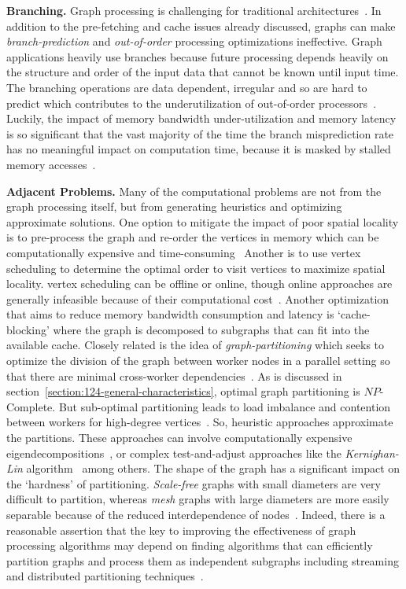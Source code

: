 \textbf{Branching.}
Graph processing is challenging for traditional architectures~\cite{Dadu2021}.
In addition to the pre-fetching and cache issues already discussed, graphs can make \textit{branch-prediction} and \textit{out-of-order} processing optimizations ineffective. 
Graph applications heavily use branches because future processing depends heavily on the structure and order of the input data that cannot be known until input time.
The branching operations are data dependent, irregular and so are hard to predict which contributes to the underutilization of out-of-order processors~\cite{Aananthakrishnan2020}.
Luckily, the impact of memory bandwidth under-utilization and memory latency is so significant that the vast majority of the time the branch misprediction rate has no meaningful impact on computation time, because it is masked by stalled memory accesses~\cite{Beamer2015}.


\textbf{Adjacent Problems.}
Many of the computational problems are not from the graph processing itself, but from generating heuristics and optimizing approximate solutions. 
One option to mitigate the impact of poor spatial locality is to pre-process the graph and re-order the vertices in memory which can be computationally expensive and time-consuming~\cite{Balaji2018}
Another is to use vertex scheduling to determine the optimal order to visit vertices to maximize spatial locality. 
vertex scheduling can be offline or online, though online approaches are generally infeasible because of their computational cost~\cite{Mukkara2018}.
Another optimization that aims to reduce memory bandwidth consumption and latency is `cache-blocking' where the graph is decomposed to subgraphs that can fit into the available cache. 
Closely related is the idea of \textit{graph-partitioning} which seeks to optimize the division of the graph between worker nodes in a parallel setting so that there are minimal cross-worker dependencies~\cite{Balaji2018}.
As is discussed in section~\ref{section:124-general-characteristics}, optimal graph partitioning is $NP$-Complete.
But sub-optimal partitioning leads to load imbalance and contention between workers for high-degree vertices~\cite{Chen2019}.
So, heuristic approaches approximate the partitions.
These approaches can involve computationally expensive eigendecompositions~\cite{Ng2001}, or complex test-and-adjust approaches like the \textit{Kernighan-Lin} algorithm~\cite{Kernighan1970} among others.
The shape of the graph has a significant impact on the `hardness' of partitioning.
\textit{Scale-free} graphs with small diameters are very difficult to partition, whereas \textit{mesh} graphs with large diameters are more easily separable because of the reduced interdependence of nodes~\cite{Beamer2015}. 
Indeed, there is a reasonable assertion that the key to improving the effectiveness of graph processing algorithms may depend on finding algorithms that can efficiently partition graphs and process them as independent subgraphs including streaming and distributed partitioning techniques~\cite{Mccune2015}.


